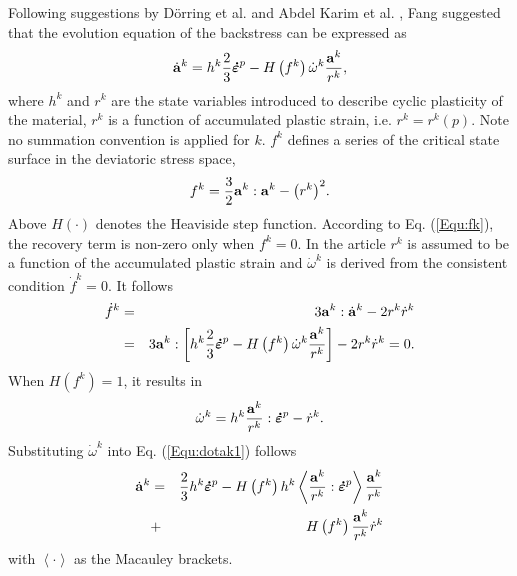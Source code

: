 \documentclass[preprint,5p,twocolumn,11pt,sort&compress]{elsarticle}
\newcommand{\dotbfepsilon}{{\mbox{\boldmath{$\dot\varepsilon$}}}}
\newcommand{\bfa}{{\bf a}}
\begin{document}
Following suggestions by D\"orring et al. \cite{Doerring2003} and Abdel Karim et al. \cite{AbdelKarim20051303}, Fang \cite{fang2015cyclic} suggested that the evolution equation of the backstress can be expressed as
\begin{equation}
\label{Equ:dotak1}
{\dot\bfa^k} = {h^k}\frac{2}{3}{\dotbfepsilon^p} - H\left( {{f^k}} \right){\dot \omega ^k}\frac{{{\bfa^k}}}{{{r^k}}},
\end{equation}
where ${{{h}}^k} $ and ${{{r}}^k} $ are the state variables introduced to describe cyclic plasticity of the material, $r^k$ is a function of accumulated plastic strain, i.e. ${r^k} = {r^k}\left( p \right)$.  Note no summation convention is applied for $k$. ${{{f}}^k} $ defines a series of the critical state surface in the deviatoric stress space,
\begin{equation}
\label{Equ:fk}
{f^k} = \frac{3}{2}{\bfa^k}:{\bfa^k} - {\left( {{r^k}} \right)^2}.
\end{equation}
Above  $H(\cdot)$ denotes the Heaviside step function. According to Eq. (\ref{Equ:fk}), the recovery term is non-zero only when ${f^k} = 0$. In the article $r^k$ is assumed to be a function of the accumulated plastic strain and ${\dot \omega ^k}$ is derived from the consistent condition ${\dot f^k} = 0$. It follows
\begin{eqnarray}
\label{Equ:dotfk}
{\dot f^k} &=& 3{\bfa^k}:{\dot\bfa^k} - 2{r^k}{\dot r^k} \\ \nonumber
&=& 3{\bfa^k}:\left[ {{h^k}\frac{2}{3}{{\dotbfepsilon}^p} - H\left( {{f^k}} \right){{\dot \omega }^k}\frac{{{\bfa^k}}}{{{r^k}}}} \right] - 2{r^k}{\dot r^k} = 0.
\end{eqnarray}
When $H\left( {{f^k}} \right) = 1$, it results in
\begin{equation}
\label{Equ:dotomegak}
{\dot \omega ^k} = {h^k}\frac{{{\bfa^k}}}{{{r^k}}}:{\dotbfepsilon^p} - {\dot r^k}.
\end{equation}
Substituting ${\dot \omega ^k}$ into Eq. (\ref{Equ:dotak1}) follows
\begin{eqnarray}
\label{Equ:dotak2}\nonumber
{\dot\bfa^k} &=& \frac{2}{3}{h^k}{\dotbfepsilon^p} - H\left( {{f^k}} \right){h^k}\left\langle {\frac{{{\bfa^k}}}{{{r^k}}}:{{\dotbfepsilon}^p}} \right\rangle \frac{{{\bfa^k}}}{{{r^k}}} \\
&+& H\left( {{f^k}} \right)\frac{{{\bfa^k}}}{{{r^k}}}{\dot r^k}
\end{eqnarray}
with $\left<\cdot\right>$ as the Macauley brackets.
\end{document}

